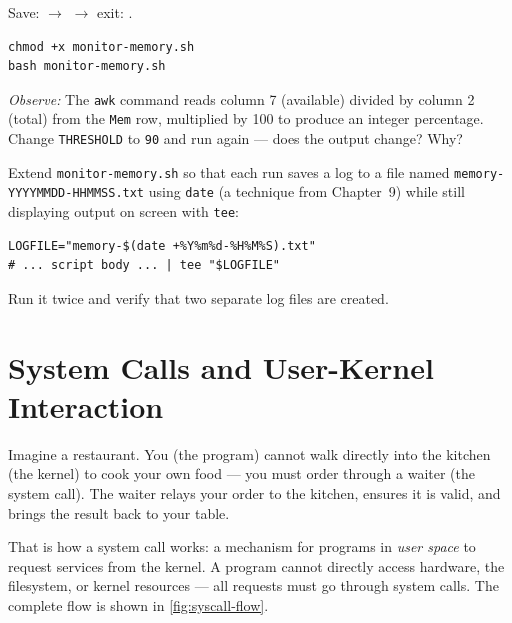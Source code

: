 \begin{notebox}
Save:  $\to$  $\to$ exit: .
\end{notebox}

\begin{lstlisting}[caption={Run the monitor script}]
chmod +x monitor-memory.sh
bash monitor-memory.sh
\end{lstlisting}

\textit{Observe:} The \texttt{awk} command reads column 7 (available) divided by
column 2 (total) from the \texttt{Mem} row, multiplied by 100 to produce an integer
percentage. Change \texttt{THRESHOLD} to \texttt{90} and run again --- does the
output change? Why?

\begin{challengebox}
Extend \texttt{monitor-memory.sh} so that each run saves a log to a file named
\texttt{memory-YYYYMMDD-HHMMSS.txt} using \texttt{date} (a technique from Chapter~9)
while still displaying output on screen with \texttt{tee}:
\begin{lstlisting}
LOGFILE="memory-$(date +%Y%m%d-%H%M%S).txt"
# ... script body ... | tee "$LOGFILE"
\end{lstlisting}
Run it twice and verify that two separate log files are created.
\end{challengebox}

\section{System Calls and User-Kernel Interaction}

Imagine a restaurant. You (the program) cannot walk directly into the kitchen
(the kernel) to cook your own food --- you must order through a waiter (the
system call). The waiter relays your order to the kitchen, ensures it is valid,
and brings the result back to your table.

That is how a system call works: a mechanism for programs in \textit{user space}
to request services from the kernel. A program cannot directly access hardware,
the filesystem, or kernel resources --- all requests must go through system calls.
The complete flow is shown in \cref{fig:syscall-flow}.

